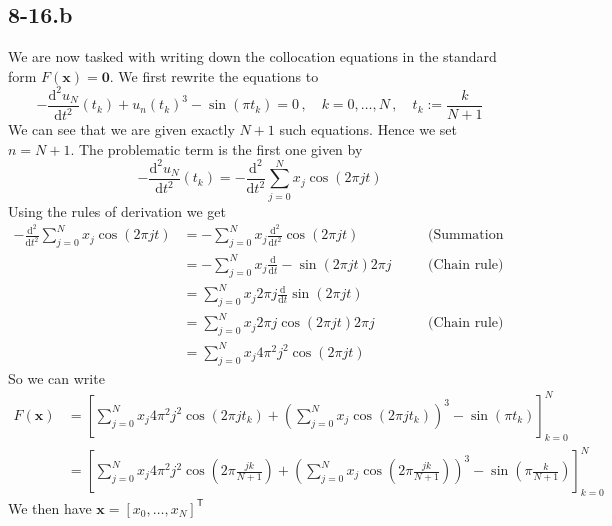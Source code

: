 \documentclass{article}
\newcommand\dm{\mathrm{d}}
\begin{document}
\subsection*{8-16.b}
We are now tasked with writing down the collocation equations in the standard form $F\left(\mathbf{x}\right) = \mathbf{0}$. We first rewrite the equations to
\begin{equation*}
   -\frac{\dm^{2}u_{N}}{\dm t^{2}}\left(t_{k}\right) + u_{n}\left(t_{k}\right)^{3} - \sin\left(\pi t_{k}\right) =0 \,,\quad k = 0, \dots, N\,,\quad t_{k} := \frac{k}{N +1} 
\end{equation*}
We can see that we are given exactly $N + 1$ such equations. Hence we set $n = N+1$. The problematic term is the first one given by
\begin{equation*}
     -\frac{\dm^{2}u_{N}}{\dm t^{2}}\left(t_{k}\right) = -\frac{\dm^{2}}{\dm t^{2}}\sum_{j=0}^{N}x_{j}\cos\left(2\pi j t\right)
\end{equation*}
Using the rules of derivation we get
\begin{align*}
    -\frac{\dm^{2}}{\dm t^{2}}\sum_{j=0}^{N}x_{j}\cos\left(2\pi j t\right) &= -\sum_{j=0}^{N}x_{j}\frac{\dm^{2}}{\dm t^{2}}\cos\left(2\pi j t\right) \quad &&\text{(Summation rule)}\\ &= -\sum_{j=0}^{N}x_{j}\frac{\dm}{\dm t}-\sin\left(2\pi j t\right)2\pi j \quad &&\text{(Chain rule)} \\
    &= \sum_{j=0}^{N}x_{j}2\pi j\frac{\dm}{\dm t}\sin\left(2\pi j t\right) \quad \\
    &= \sum_{j=0}^{N}x_{j}2\pi j\cos\left(2\pi j t\right) 2\pi j \quad &&\text{(Chain rule)} \\
    &= \sum_{j=0}^{N}x_{j}4\pi^{2} j^{2}\cos\left(2\pi j t\right)
\end{align*}
So we can write 
\begin{align*}
    F\left(\mathbf{x}\right) &= \left[\sum_{j=0}^{N}x_{j}4\pi^{2} j^{2}\cos\left(2\pi j t_{k}\right) + \left(\sum_{j=0}^{N}x_{j}\cos\left(2\pi j t_{k}\right)\right)^{3} -\sin\left(\pi t_{k}\right)\right]_{k=0}^{N} \\
    &=\left[\sum_{j=0}^{N}x_{j}4\pi^{2} j^{2}\cos\left(2\pi \frac{jk}{N+1}\right) + \left(\sum_{j=0}^{N}x_{j}\cos\left(2\pi \frac{jk}{N+1}\right)\right)^{3} -\sin\left(\pi \frac{k}{N+1}\right)\right]_{k=0}^{N}
\end{align*}
We then have $\mathbf{x} = \left[x_{0}, \dots, x_{N}\right]^{\mathsf{T}}$

\pagebreak
\end{document}
